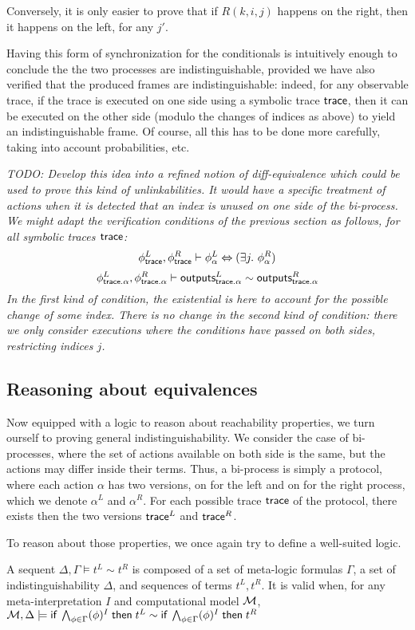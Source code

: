 Conversely, it is only easier to prove that if $R(k,i,j)$ happens
on the right, then it happens on the left, for any $j'$.

Having this form of synchronization for the conditionals is intuitively
enough to conclude the the two processes are indistinguishable,
provided we have also verified that the produced frames are indistinguishable:
indeed, for any observable trace, if the trace is executed on one side
using a symbolic trace $\textsf{trace}$, then it can be executed on the other side
(modulo the changes of indices as above) to yield an indistinguishable
frame. Of course, all this has to be done more carefully, taking into
account probabilities, etc.

\emph{TODO: Develop this idea into a refined notion of diff-equivalence
which could be used to prove this kind of unlinkabilities. It would have
a specific treatment of actions when it is detected that an index is unused
on one side of the bi-process. We might adapt the verification conditions
of the previous section as follows, for all symbolic traces $\textsf{trace}$:}
$$ \phi^L_{\textsf{trace}}, \phi^R_{\textsf{trace}} \vdash
   \phi^L_\alpha \Leftrightarrow (\exists j.~ \phi^R_\alpha) $$
$$ \phi^L_{\textsf{trace}.\alpha}, \phi^R_{\textsf{trace}.\alpha} \vdash 
   \textsf{outputs}_{\textsf{trace}.\alpha}^L \sim \textsf{outputs}_{\textsf{trace}.\alpha}^R $$
\emph{In the first kind of condition, the existential is here to account
for the possible change of some index. There is no change in the second
kind of condition: there we only consider executions where the conditions
have passed on both sides, restricting indices $j$.}

\subsection{Reasoning about equivalences}

Now equipped with a logic to reason about reachability properties, we turn 
ourself to proving general indistinguishability. We consider the case of 
bi-processes, where the set of actions available on both side is the same, but 
the actions may differ inside their terms. Thus, a bi-process is simply a 
protocol, where each action $\alpha$ has two versions, on for the left and on 
for the right process, which we denote $\alpha^L$ and $\alpha^R$. For each 
possible trace $\textsf{trace}$ of the protocol, there exists then the two versions 
$\textsf{trace}^L$ and $\textsf{trace}^R$.

To reason about those properties, we once again try to define a well-suited logic.
\begin{definition}
  A sequent $\Delta, \Gamma \vDash t^L \sim t^R $ is composed of a set of meta-logic formulas
  $\Gamma$, a set of indistinguishability $\Delta$, and sequences of terms $t^L,t^R$.
  It is valid when, for any meta-interpretation $I$ and computational model $\mathcal{M}$, $\mathcal{M}, \Delta \models \textsf{if}\; \bigwedge_{\phi \in \Gamma} (\phi)^I \;\textsf{then}\; t^L \sim  \textsf{if}\; \bigwedge_{\phi \in \Gamma} (\phi)^I \;\textsf{then}\; t^R $
\end{definition}


